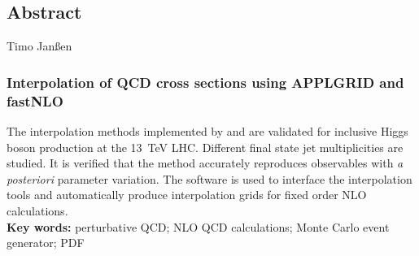
%
%
%
\subsection*{Abstract}

Timo Janßen
\subsubsection*{Interpolation of QCD cross sections using APPLGRID and fastNLO}
The interpolation methods implemented by \appl{} and \fnlo{} are validated for inclusive Higgs boson production at the \SI{13}{\tera\electronvolt} LHC.
Different final state jet multiplicities are studied. 
It is verified that the method accurately reproduces observables with \textit{a posteriori} parameter variation.
The \mcgrid{} software is used to interface the interpolation tools and automatically produce interpolation grids for fixed order NLO calculations.
%
\mbox{}\\[0.5\baselineskip]\noindent
\textbf{Key words:} 
perturbative QCD; NLO QCD calculations; Monte Carlo event generator; PDF
